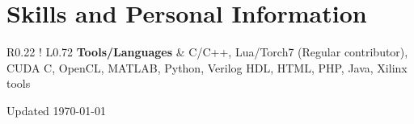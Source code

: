 \documentclass[11pt]{article}
\newcommand\VRule{\color{lightgray}\vrule width 0.5pt}      %
\begin{document}
\section*{Skills and Personal Information}
\begin{tabular}{R{0.22\textwidth} !{\VRule} L{0.72\textwidth}}
  {\bf Tools/Languages}         & C/C++, Lua/Torch7 (Regular contributor), CUDA C, OpenCL, MATLAB, Python, Verilog HDL, HTML, PHP, Java, Xilinx tools \\ [0pt]
\end{tabular}
{\vspace{10pt}\newline\newline
\vspace{10pt}
\scriptsize\hfill Updated \today}
\end{document}
